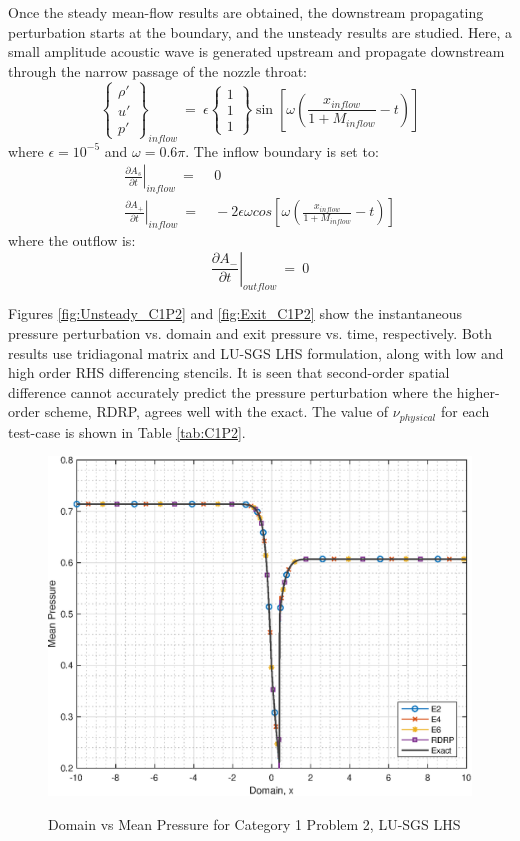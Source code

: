 \documentclass[conf]{new-aiaa}
\begin{document}
Once the steady mean-flow results are obtained, the downstream propagating perturbation starts at the boundary, and the unsteady results are studied.  
Here, a small amplitude acoustic wave is generated upstream and propagate downstream through the narrow passage of the nozzle throat:
\begin{equation*}
	\left\{
	\begin{matrix}
		{\rho}' \\
		{u}' \\
		{p}'
	\end{matrix}
	\right\}_{inflow}~=~
\epsilon
	\left\{
	\begin{matrix}
		1 \\
		1 \\
		1
	\end{matrix}
	\right\}\sin\left[\omega\left(\frac{x_{inflow}}{1+M_{inflow}}-t\right)\right]
\end{equation*}
where $\epsilon=10^{-5}$ and $\omega=0.6\pi$.  
The inflow boundary is set to:
\begin{equation*}
	\begin{split}
		\left.\frac{\partial{A_s}}{\partial{t}}\right|_{inflow}~=&~0 \\
		\left.\frac{\partial{A_+}}{\partial{t}}\right|_{inflow}~=&~-2\epsilon\omega cos\left[\omega\left(\frac{x_{inflow}}{1 + M_{inflow}}-t \right)\right]
	\end{split}
\end{equation*}
where the outflow is:
\begin{equation*}
		\left.\frac{\partial{A_-}}{\partial{t}}\right|_{outflow}~=~0
\end{equation*}

Figures \ref{fig:Unsteady_C1P2} and \ref{fig:Exit_C1P2} show the instantaneous pressure perturbation vs. domain and exit pressure vs. time, respectively. 
Both results use tridiagonal matrix and LU-SGS LHS formulation, along with low and high order RHS differencing stencils. 
It is seen that second-order spatial difference cannot accurately predict the pressure perturbation where the higher-order scheme, RDRP, agrees well with the exact. 
The value of $\nu_{physical}$ for each test-case is shown in Table \ref{tab:C1P2}.   

\begin{figure}[hbtp!]
	\centering
	{\includegraphics[width=.7\textwidth]{Figures/LUSGS_C1P2}}
	\caption{Domain vs Mean Pressure for Category 1 Problem 2, LU-SGS LHS}
	\label{fig:LUSGS_C1P2}
\end{figure}
\end{document}
